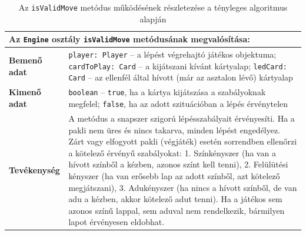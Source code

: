 \begin{table}[H]
    \centering
    \begin{tabular}{| p{} | p{} |}
        \hline
        \multicolumn{2}{|l|}{\textbf{Az \texttt{Engine} osztály \texttt{isValidMove} metódusának megvalósítása:}} \\
        \hline
        \textbf{Bemenő adat} & \texttt{player: Player} -- a lépést végrehajtó játékos objektuma; \texttt{cardToPlay: Card} -- a kijátszani kívánt kártyalap; \texttt{ledCard: Card} -- az ellenfél által hívott (már az asztalon lévő) kártyalap \\
        \hline
        \textbf{Kimenő adat} & \texttt{boolean} -- \texttt{true}, ha a kártya kijátszása a szabályoknak megfelel; \texttt{false}, ha az adott szituációban a lépés érvénytelen \\
        \hline
        \textbf{Tevékenység} & A metódus a snapszer szigorú lépésszabályait érvényesíti. Ha a pakli nem üres és nincs takarva, minden lépést engedélyez. Zárt vagy elfogyott pakli (végjáték) esetén sorrendben ellenőrzi a kötelező érvényű szabályokat: 1. Színkényszer (ha van a hívott színből a kézben, azonos színt kell tenni), 2. Felülütési kényszer (ha van erősebb lap az adott színből, azt kötelező megjátszani), 3. Adukényszer (ha nincs a hívott színből, de van adu a kézben, akkor kötelező adut tenni). Ha a játékos sem azonos színű lappal, sem aduval nem rendelkezik, bármilyen lapot érvényesen eldobhat. \\
        \hline
    \end{tabular}
    \caption{Az \texttt{isValidMove} metódus működésének részletezése a tényleges algoritmus alapján}
    \label{tab:actual_isvalidmove_spec}
\end{table}

